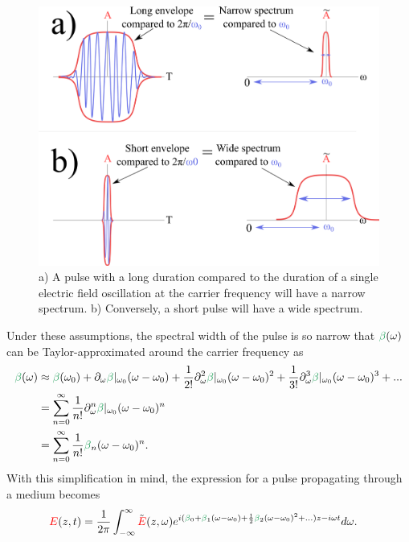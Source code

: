 \begin{figure}
    \centering
    \includegraphics[width=1\linewidth]{figures/bandwidth.png}
    \caption{a) A pulse with a long duration compared to the duration of a single electric field oscillation at the carrier frequency will have a narrow spectrum. b) Conversely, a short pulse will have a wide spectrum.}
    \label{fig:bandwidth}
\end{figure}

Under these assumptions, the spectral width of the pulse is so narrow that $\betag(\omega)$ can be Taylor-approximated around the carrier frequency as
\begin{align}
\label{eq:beta_approx}
    \betag(\omega)&\approx \betag(\omega_0)+\partial_\omega\betag|_{\omega_0}(\omega-\omega_0)+\frac{1}{2!}\partial^2_\omega\betag|_{\omega_0}(\omega-\omega_0)^2+
    \frac{1}{3!}\partial^3_\omega\betag|_{\omega_0}(\omega-\omega_0)^3+... \\ \nonumber
    &= \sum_{n=0}^{\infty} \frac{1}{n!}\partial^n_\omega\betag|_{\omega_0}(\omega-\omega_0)^n\\ \nonumber
    &=\sum_{n=0}^{\infty} \frac{1}{n!}\betag_n(\omega-\omega_0)^n.
\end{align}
With this simplification in mind, the expression for a pulse propagating through a medium becomes
\begin{align}
\label{eq:beta_approx_applied}
    \E(z,t) &= \frac{1}{2\pi}\int_{-\infty}^{\infty} \Tilde{\E}(z,\omega) e^{i(\betag_0+\betag_1(\omega-\omega_0)+\frac{1}{2}\betag_2(\omega-\omega_0)^2+...)z-i\omega t} d\omega.
\end{align}


